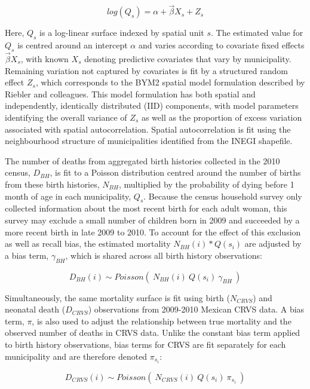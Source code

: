 \documentclass[
]{report}
\begin{document}
\[log(Q_s) = \alpha + \overrightarrow{\beta}X_s + Z_s\]

Here, \(Q_s\) is a log-linear surface indexed by spatial unit \(s\). The estimated value for \(Q_s\) is centred around an intercept \(\alpha\) and varies according to covariate fixed effects \(\overrightarrow{\beta}X_s\), with known \(X_s\) denoting predictive covariates that vary by municipality. Remaining variation not captured by covariates is fit by a structured random effect \(Z_s\), which corresponds to the BYM2 spatial model formulation described by Riebler and colleagues.\autocite{Riebler2016} This model formulation has both spatial and independently, identically distributed (IID) components, with model parameters identifying the overall variance of \(Z_s\) as well as the proportion of excess variation associated with spatial autocorrelation. Spatial autocorrelation is fit using the neighbourhood structure of municipalities identified from the INEGI shapefile.\autocite{INEGI2010b}

The number of deaths from aggregated birth histories collected in the 2010 census, \(D_{BH}\), is fit to a Poisson distribution centred around the number of births from these birth histories, \(N_{BH}\), multiplied by the probability of dying before 1 month of age in each municipality, \(Q_s\). Because the census household survey only collected information about the most recent birth for each adult woman, this survey may exclude a small number of children born in 2009 and succeeded by a more recent birth in late 2009 to 2010. To account for the effect of this exclusion as well as recall bias, the estimated mortality \(N_{BH}(i)*Q(s_i)\) are adjusted by a bias term, \(\gamma_{BH}\), which is shared across all birth history observations:

\[ D_{BH}(i) \sim Poisson(~N_{BH}(i)~Q(s_i)~\gamma_{BH}~)\]

Simultaneously, the same mortality surface is fit using birth (\(N_{CRVS}\)) and neonatal death (\(D_{CRVS}\)) observations from 2009-2010 Mexican CRVS data. A bias term, \(\pi\), is also used to adjust the relationship between true mortality and the observed number of deaths in CRVS data. Unlike the constant bias term applied to birth history observations, bias terms for CRVS are fit separately for each municipality and are therefore denoted \(\pi_{s_i}\):

\[D_{CRVS}(i) \sim Poisson(~N_{CRVS}(i)~Q(s_i)~\pi_{s_i}~)\]
\end{document}
